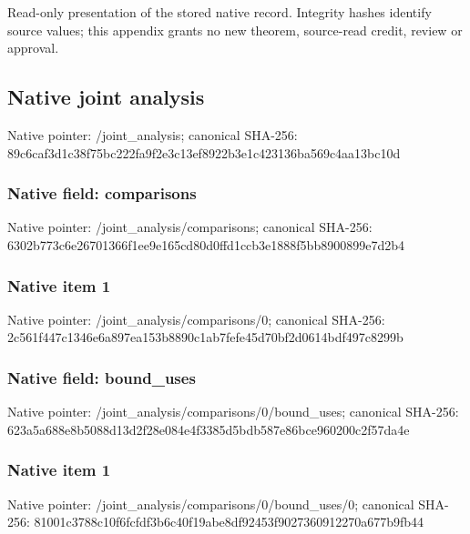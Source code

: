 \documentclass[10pt,a4paper]{article}
\begin{document}
Read-only presentation of the stored native record. Integrity hashes identify source values; this appendix grants no new theorem, source-read credit, review or approval.



\subsection{Native joint analysis}


Native pointer: /joint\_analysis; canonical SHA-256: 89c6caf3d1c38f75bc222fa9\allowbreak{}f2e3c13ef8922b3e1c423136\allowbreak{}ba569c4aa13bc10d



\subsubsection{Native field: comparisons}


Native pointer: /joint\_analysis/comparisons; canonical SHA-256: 6302b773c6e26701366f1ee9\allowbreak{}e165cd80d0ffd1ccb3e1888f\allowbreak{}5bb8900899e7d2b4



\subsubsection{Native item 1}


Native pointer: /joint\_analysis/comparisons/0; canonical SHA-256: 2c561f447c1346e6a897ea15\allowbreak{}3b8890c1ab7fefe45d70bf2d\allowbreak{}0614bdf497c8299b



\subsubsection{Native field: bound\_uses}


Native pointer: /joint\_analysis/comparis\allowbreak{}ons/0/bound\_uses; canonical SHA-256: 623a5a688e8b5088d13d2f28\allowbreak{}e084e4f3385d5bdb587e86bc\allowbreak{}e960200c2f57da4e



\subsubsection{Native item 1}


Native pointer: /joint\_analysis/comparis\allowbreak{}ons/0/bound\_uses/0; canonical SHA-256: 81001c3788c10f6fcfdf3b6c\allowbreak{}40f19abe8df92453f9027360\allowbreak{}912270a677b9fb44
\end{document}
